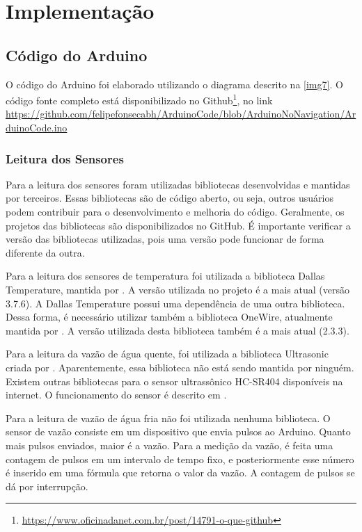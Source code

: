 \chapter{Implementação}
	
	\section{Código do Arduino}
		O código do Arduino foi elaborado utilizando o diagrama descrito na \autoref{img7}. O código fonte completo está disponibilizado no Github\footnote{\url{https://www.oficinadanet.com.br/post/14791-o-que-github}}, no link \url{https://github.com/felipefonsecabh/ArduinoCode/blob/ArduinoNoNavigation/ArduinoCode.ino}
		
		\subsection{Leitura dos Sensores}
		
		Para a leitura dos sensores foram utilizadas bibliotecas desenvolvidas e mantidas por terceiros. Essas bibliotecas são de código aberto, ou seja, outros usuários podem contribuir para o desenvolvimento e melhoria do código. Geralmente, os projetos das bibliotecas são disponibilizados no GitHub. É importante verificar a versão das bibliotecas utilizadas, pois uma versão pode funcionar de forma diferente da outra.
		
		Para a leitura dos sensores de temperatura foi utilizada a biblioteca Dallas Temperature, mantida por \textcite{miles2016}. A versão utilizada no projeto é a mais atual (versão 3.7.6). A Dallas Temperature possui uma dependência de uma outra biblioteca. Dessa forma, é necessário utilizar também a biblioteca OneWire, atualmente mantida por \textcite{paul2017}. A versão utilizada desta biblioteca também é a mais atual (2.3.3).
		
		Para a leitura da vazão de água quente, foi utilizada a biblioteca Ultrasonic criada por \textcite{filipeflop2011}. Aparentemente, essa biblioteca não está sendo mantida por ninguém. Existem outras bibliotecas para o sensor ultrassônico HC-SR404 disponíveis na internet. O funcionamento do sensor é descrito em \textcite{adilson2011}.
		
		Para a leitura de vazão de água fria não foi utilizada nenhuma biblioteca. O sensor de vazão consiste em um dispositivo que envia pulsos  ao Arduino. Quanto mais pulsos enviados, maior é a vazão. Para a medição da vazão, é feita uma contagem de pulsos em um intervalo de tempo fixo, e posteriormente esse número é inserido em uma fórmula que retorna o valor da vazão. A contagem de pulsos se dá por interrupção.
		
